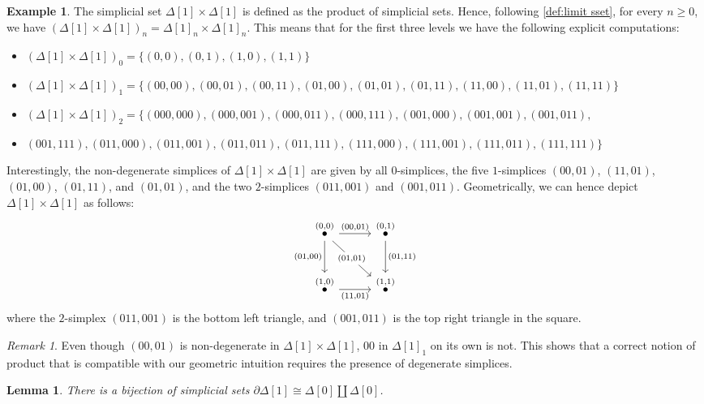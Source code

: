 \documentclass[11pt, a4paper]{amsart}
\newtheorem{lemma}[equation]{Lemma}
\theoremstyle{definition}
\newtheorem{example}[equation]{Example}
\theoremstyle{remark}
\newtheorem{remark}[equation]{Remark}
\numberwithin{equation}{section}
\begin{document}
\begin{example}
  The simplicial set $\Delta[1] \times \Delta[1]$ is defined as the product of simplicial sets. Hence, following \cref{def:limit sset}, for every $n \geq 0$, we have $(\Delta[1] \times \Delta[1])_n = \Delta[1]_n \times \Delta[1]_n$. This means that for the first three levels we have the following explicit computations:
  {\small
  \begin{itemize}[leftmargin=*]
    \item $(\Delta[1] \times \Delta[1])_0 = \{(0,0), (0,1), (1,0), (1,1)\}$
    \item $(\Delta[1] \times \Delta[1])_1 = \{(00,00), (00,01), (00,11), (01,00), (01,01), (01,11), (11,00), (11,01), (11,11)\}$
    \item $(\Delta[1] \times \Delta[1])_2 = \{(000,000), (000,001), (000,011), (000,111), (001,000), (001,001), (001,011),$ 
    \item[] $(001,111), (011,000), (011,001), (011,011), (011,111), (111,000), (111,001), (111,011), (111,111)\}$
  \end{itemize}
  }
  Interestingly, the non-degenerate simplices of $\Delta[1] \times \Delta[1]$ are given by all $0$-simplices, the five $1$-simplices $(00,01)$, $(11,01)$, $(01,00)$, $(01,11)$, and $(01,01)$, and the two $2$-simplices $(011,001)$ and $(001,011)$. Geometrically, we can hence depict $\Delta[1] \times \Delta[1]$ as follows:
  \[ 
  \begin{tikzcd}[row sep=1cm, column sep=1cm]
    \overset{(0,0)}{\bullet} \arrow[r, "{(00,01)}"] \arrow[d, "{(01,00)}"'] \arrow[dr, "{(01,01)}" description] & \overset{(0,1)}{\bullet} \arrow[d, "{(01,11)}"] \\
    \overset{(1,0)}{\bullet} \arrow[r, "{(11,01)}"'] & \overset{(1,1)}{\bullet}
  \end{tikzcd}
  \]
  where the $2$-simplex $(011,001)$ is the bottom left triangle, and $(001,011)$ is the top right triangle in the square.
\end{example}

\begin{remark}\label{rem:degenerate in products}
  Even though $(00,01)$ is non-degenerate in $\Delta[1] \times \Delta[1]$, $00$ in $\Delta[1]_1$ on its own is not. This shows that a correct notion of product that is compatible with our geometric intuition requires the presence of degenerate simplices.
\end{remark}

\begin{lemma} \label{lemma:boundary colimit}
  There is a bijection of simplicial sets $\partial \Delta[1] \cong \Delta[0] \coprod \Delta[0]$.
\end{lemma}
\end{document}
